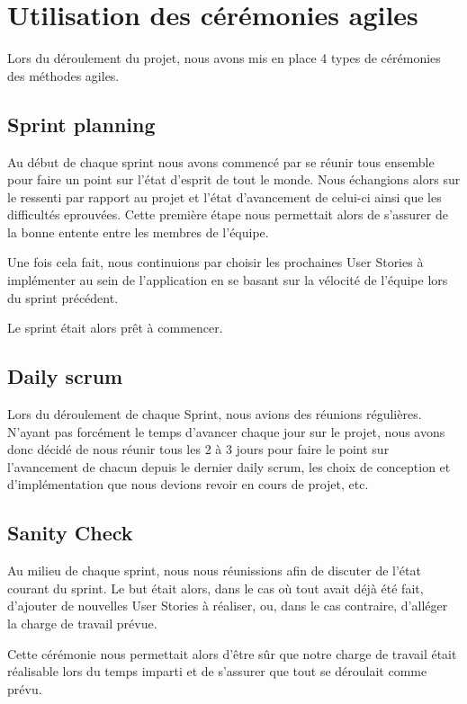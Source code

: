 \documentclass[11pt]{report}
\begin{document}
\section{Utilisation des cérémonies agiles}

Lors du déroulement du projet, nous avons mis en place 4 types de cérémonies des méthodes agiles.

\subsection{Sprint planning}

Au début de chaque sprint nous avons commencé par se réunir tous ensemble pour faire un point sur l'état d'esprit de tout le monde.
Nous échangions alors sur le ressenti par rapport au projet et l'état d'avancement de celui-ci ainsi que les difficultés eprouvées. Cette première étape
nous permettait alors de s'assurer de la bonne entente entre les membres de l'équipe.

Une fois cela fait, nous continuions par choisir les prochaines User Stories à implémenter au sein de l'application en se basant sur la vélocité
de l'équipe lors du sprint précédent.\newline

Le sprint était alors prêt à commencer.

\subsection{Daily scrum}

Lors du déroulement de chaque Sprint, nous avions des réunions régulières. N'ayant pas forcément le temps
d'avancer chaque jour sur le projet, nous avons donc décidé de nous réunir tous les 2 à 3 jours
pour faire le point sur l'avancement de chacun depuis le dernier daily scrum, les choix de conception et d'implémentation que
nous devions revoir en cours de projet, etc.

\subsection{Sanity Check}

Au milieu de chaque sprint, nous nous réunissions afin de discuter de l'état courant du sprint. Le but était alors, dans le cas
où tout avait déjà été fait, d'ajouter de nouvelles User Stories à réaliser, ou, dans le cas contraire, d'alléger la charge
de travail prévue.

Cette cérémonie nous permettait alors d'être sûr que notre charge de travail était réalisable lors du temps imparti
et de s'assurer que tout se déroulait comme prévu.
\end{document}
